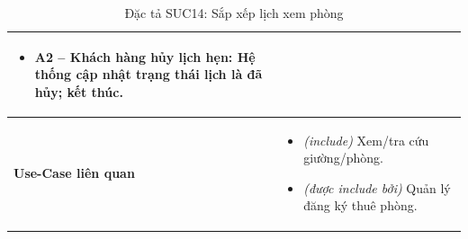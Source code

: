 \begin{table}[H]
\begin{tabularx}{\textwidth}{|>{\centering\arraybackslash\bfseries}m{3.5cm}|X|}
\begin{itemize}[leftmargin=*, nosep, label=-]
        \item \textbf{A2 -- Khách hàng hủy lịch hẹn:} Hệ thống cập nhật trạng thái lịch là đã hủy; kết thúc.
    \end{itemize} \\
    \hline
    Use-Case liên quan &
    \begin{itemize}[leftmargin=*, nosep, label=-]
        \vspace{0.1cm}
        \item \textit{(include)} Xem/tra cứu giường/phòng.
        \item \textit{(được include bởi)} Quản lý đăng ký thuê phòng.
\end{itemize} \\
    \hline
\end{tabularx}
\caption{Đặc tả SUC14: Sắp xếp lịch xem phòng}
\end{table}



